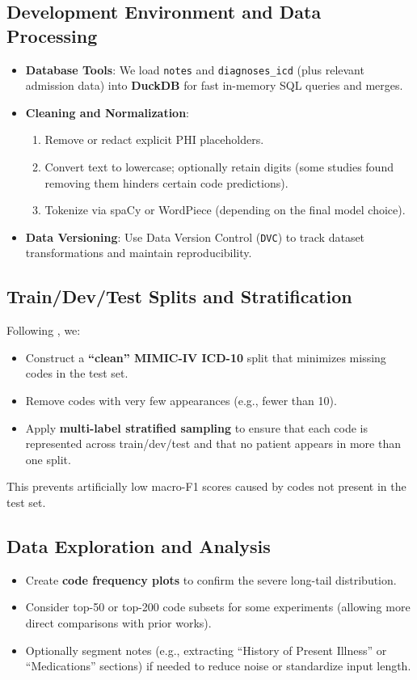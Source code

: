 \subsection{Development Environment and Data Processing}
\begin{itemize}
    \item \textbf{Database Tools}: We load \texttt{notes} and \texttt{diagnoses\_icd} (plus relevant admission data) into \textbf{DuckDB} for fast in-memory SQL queries and merges.
    \item \textbf{Cleaning and Normalization}:
    \begin{enumerate}
        \item Remove or redact explicit PHI placeholders.
        \item Convert text to lowercase; optionally retain digits (some studies found removing them hinders certain code predictions).
        \item Tokenize via spaCy or WordPiece (depending on the final model choice).
    \end{enumerate}
    \item \textbf{Data Versioning}: Use Data Version Control (\texttt{DVC}) to track dataset transformations and maintain reproducibility.
\end{itemize}

\subsection{Train/Dev/Test Splits and Stratification}
Following \cite{edin2023automated}, we:
\begin{itemize}
    \item Construct a \textbf{“clean” MIMIC-IV ICD-10} split that minimizes missing codes in the test set.
    \item Remove codes with very few appearances (e.g., fewer than 10).
    \item Apply \textbf{multi-label stratified sampling} to ensure that each code is represented across train/dev/test and that no patient appears in more than one split.
\end{itemize}
This prevents artificially low macro-F1 scores caused by codes not present in the test set.

\subsection{Data Exploration and Analysis}
\begin{itemize}
    \item Create \textbf{code frequency plots} to confirm the severe long-tail distribution.
    \item Consider top-50 or top-200 code subsets for some experiments (allowing more direct comparisons with prior works).
    \item Optionally segment notes (e.g., extracting “History of Present Illness” or “Medications” sections) if needed to reduce noise or standardize input length.
\end{itemize}



